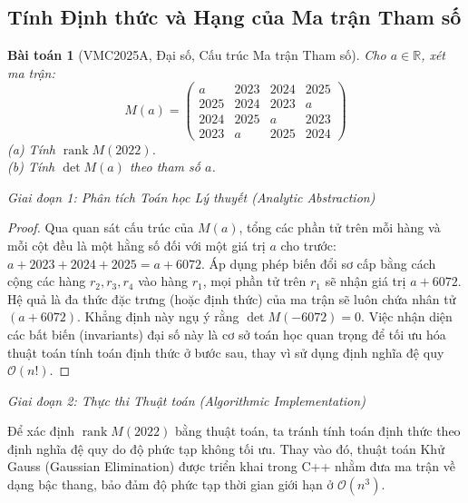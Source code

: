 \documentclass{article}
\newtheorem{baitoan}{Bài toán}
\begin{document}
\subsection{Tính Định thức và Hạng của Ma trận Tham số}

\begin{baitoan}[VMC2025A, Đại số, Cấu trúc Ma trận Tham số]
	Cho $a\in\mathbb{R}$, xét ma trận:
	\begin{equation*}
		M(a) = \begin{pmatrix}
			a & 2023 & 2024 & 2025\\2025 & 2024 & 2023 & a\\2024 & 2025 & a & 2023\\2023 & a & 2025 & 2024
		\end{pmatrix}
	\end{equation*}
	(a) Tính $\operatorname{rank}M(2022)$.\\
	(b) Tính $\det M(a)$ theo tham số $a$.
\end{baitoan}

\vspace{0.5em}\noindent\emph{Giai đoạn 1: Phân tích Toán học Lý thuyết (Analytic Abstraction)}

\begin{proof}
Qua quan sát cấu trúc của $M(a)$, tổng các phần tử trên mỗi hàng và mỗi cột đều là một hằng số đối với một giá trị $a$ cho trước: $a + 2023 + 2024 + 2025 = a + 6072$. 
Áp dụng phép biến đổi sơ cấp bằng cách cộng các hàng $r_2, r_3, r_4$ vào hàng $r_1$, mọi phần tử trên $r_1$ sẽ nhận giá trị $a + 6072$.
Hệ quả là đa thức đặc trưng (hoặc định thức) của ma trận sẽ luôn chứa nhân tử $(a + 6072)$. Khẳng định này ngụ ý rằng $\det M(-6072) = 0$. Việc nhận diện các bất biến (invariants) đại số này là cơ sở toán học quan trọng để tối ưu hóa thuật toán tính toán định thức ở bước sau, thay vì sử dụng định nghĩa đệ quy $\mathcal{O}(n!)$.
\end{proof}

\vspace{0.5em}\noindent\emph{Giai đoạn 2: Thực thi Thuật toán (Algorithmic Implementation)}

Để xác định $\operatorname{rank}M(2022)$ bằng thuật toán, ta tránh tính toán định thức theo định nghĩa đệ quy do độ phức tạp không tối ưu. Thay vào đó, thuật toán Khử Gauss (Gaussian Elimination) được triển khai trong C++ nhằm đưa ma trận về dạng bậc thang, bảo đảm độ phức tạp thời gian giới hạn ở $\mathcal{O}(n^3)$.

\end{document}
